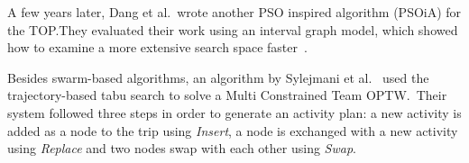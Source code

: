 A few years later, Dang et al.\ wrote another PSO inspired algorithm (PSOiA) for
the TOP.\@ They evaluated their work using an interval graph model, which showed
how to examine a more extensive search space faster~\cite{Gunawan2016}.

Besides swarm-based algorithms, an algorithm by Sylejmani et al.~\cite{Sylejmani2012}
used the trajectory-based tabu search to solve a Multi Constrained Team OPTW.\
Their system followed three steps in order to generate an activity plan: a new
activity is added as a node to the trip using \emph{Insert}, a node is
exchanged with a new activity using \emph{Replace} and two nodes swap with each
other using \emph{Swap}. 

